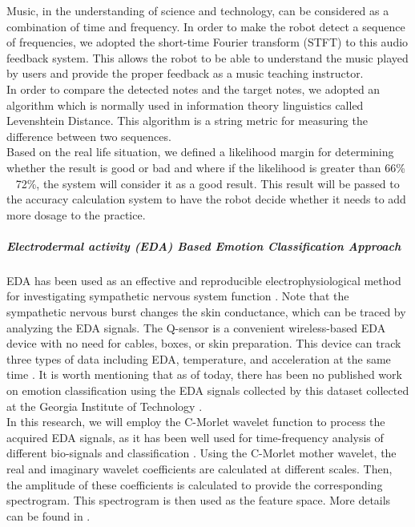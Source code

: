 \documentclass[12pt]{report}
\begin{document}
Music, in the understanding of science and technology, can be considered as a combination 
of time and frequency. In order to make the robot detect a sequence of frequencies, we adopted the 
short-time Fourier transform (STFT) to this audio feedback system. This allows the robot to 
be able to understand the music played by users and provide the proper feedback as
a music teaching instructor.\\

In order to compare the detected notes and the target notes, we adopted an algorithm
which is normally used in information theory linguistics called Levenshtein Distance.
This algorithm is a string metric for measuring the difference between two sequences.\\

Based on the real life situation, we defined a likelihood margin for determining whether the result
is good or bad and where if the likelihood is greater than 66\% ~ 72\%, the system will consider it 
as a good result. This result will be passed to the accuracy calculation system to have the robot 
decide whether it needs to add more dosage to the practice.\\


\subparagraph{Electrodermal activity (EDA) Based Emotion Classification Approach} 
EDA has been used as an effective and reproducible electrophysiological method for 
investigating sympathetic nervous system function \cite{WearableDevice2016, AssociationBetween2013, SympatheticSkin1984, PrincipalComponent2000}. Note that the sympathetic nervous 
burst changes the skin conductance, which can be traced by analyzing the EDA signals\cite{SkinConduct2006, SympatheticSkin1981, DecodeChild2013}. The Q-sensor 
is a convenient wireless-based EDA device with no need for cables, boxes, or skin 
preparation. This device can track three types of data including EDA, temperature, 
and acceleration at the same time \cite{Validation2013}. It is worth mentioning that 
as of today, there has been no published work on emotion classification using the 
EDA signals collected by this dataset collected at the Georgia Institute of 
Technology \cite{DecodeChild2013}.\\

In this research, we will employ the C-Morlet wavelet function to process the acquired EDA 
signals, as it has been well used for time-frequency analysis of different bio-signals 
and classification \cite{MultKernel2016}. Using the C-Morlet mother wavelet, the real and imaginary wavelet coefficients are calculated at different scales. Then, the amplitude of these coefficients is calculated to provide the corresponding spectrogram. This spectrogram is then used as the feature space. More details can be found in \cite{hFeng18}.\\


\appendix

\baselineskip 0.21in


\baselineskip 0.33in
\end{document}
